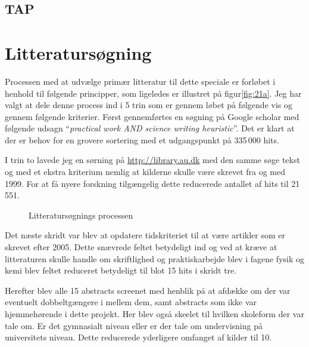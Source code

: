 \subsection*{TAP}


\clearpage

\section{Litteratursøgning}
\label{sec:2.2}

Processen med at udvælge primær litteratur til dette speciale er forløbet i henhold til følgende principper, som ligeledes er illustret på  figur\vref{fig:21a}. Jeg har valgt at dele denne process ind i 5 trin som er gennem løbet på følgende vis og gennem følgende kriterier. Først gennemførtes en søgning på Google scholar med følgende udsagn ``\emph{practical work AND science writing heuristic}''. Det er klart at der er behov for en grovere sortering med et udgangspunkt på 335\,000 hits. 

I trin to lavede jeg en sørning på \url{http://library.au.dk} med den samme søge tekst og med et ekstra kriterium nemlig at kilderne skulle være skrevet fra og med 1999. For at få nyere forskning tilgængelig dette reducerede antallet af hits til 21\,551. 
\begin{wrapfigure}{o}{0.5\textwidth}
	\centering
	\vspace{-20pt}
	\vspace{0pt}
	\caption{Litteratursøgnings processen}
	\label{fig:21a}
	\vspace{-20pt}
\end{wrapfigure}
Det næste skridt var blev at opdatere tidskriteriet til at være artikler som er skrevet efter 2005. Dette snævrede feltet betydeligt ind og ved at kræve at litteraturen skulle handle om skriftlighed og praktiskarbejde blev i fagene fysik og kemi blev feltet reduceret betydeligt til blot 15 hits i skridt tre.

Herefter blev alle 15 abstracts screenet med henblik på at afdække om der var eventuelt dobbeltgængere i mellem dem, samt abstracts som ikke var hjemmehørende i dette projekt. Her blev også skeelet til hvilken skoleform der var tale om. Er det gymnasialt niveau eller er der tale om undervisning på universitets niveau. Dette reducerede yderligere omfanget af kilder til 10.

